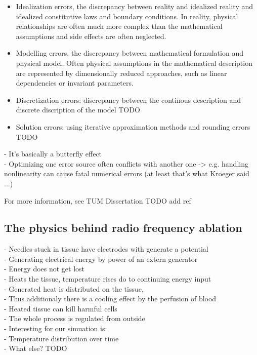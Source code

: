 \documentclass[parskip=half, titlepage=yes, 12pt, BCOR=12mm, DIV=calc]{scrartcl}
\begin{document}
\begin{itemize}
    \item Idealization errors, the discrepancy between reality and idealized reality and idealized constitutive laws and boundary conditions. In reality, physical relationships are often much more complex than the mathematical assumptions and side effects are often neglected.
    \item Modelling errors, the discrepancy between mathematical formulation and physical model. Often physical assumptions in the mathematical description are represented by dimensionally reduced approaches, such as linear dependencies or invariant parameters.
    \item  Discretization errors: discrepancy between the continous description and discrete discription of the model TODO
    \item Solution errors: using iterative approximation methods and rounding errors  TODO \\
\end{itemize}


- It's basically a butterfly effect \\
- Optimizing one error source often conflicts with another one -> e.g. handling nonlinearity can cause fatal numerical errors (at least that's what Kroeger said ...)

For more information, see TUM Dissertation TODO add ref


\subsection{The physics behind radio frequency ablation}
- Needles stuck in tissue have electrodes with generate a potential \\
- Generating electrical energy by power of an extern generator \\
- Energy does not get lost \\
- Heats the tissue, temperature rises do to continuing energy input \\
- Generated heat is distributed on the tissue,  \\
- Thus additionaly there is a cooling effect by the perfusion of blood \\
- Heated tissue can kill harmful cells \\
- The whole process is regulated from outside \\

- Interesting for our simuation is: \\
- Temperature distribution over time \\
- What else? TODO \\
\end{document}

